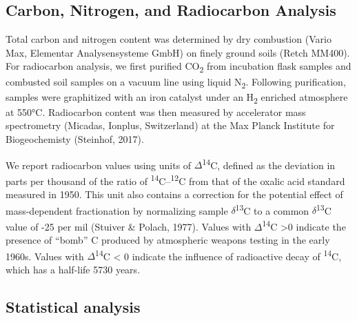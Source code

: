 \documentclass[english,man,floatsintext]{apa6}
\begin{document}
\hypertarget{carbon-nitrogen-and-radiocarbon-analysis}{%
\subsection{Carbon, Nitrogen, and Radiocarbon Analysis}\label{carbon-nitrogen-and-radiocarbon-analysis}}

Total carbon and nitrogen content was determined by dry combustion (Vario Max, Elementar Analysensysteme GmbH) on finely ground soils (Retch MM400). For radiocarbon analysis, we first purified CO\textsubscript{2} from incubation flask samples and combusted soil samples on a vacuum line using liquid N\textsubscript{2}. Following purification, samples were graphitized with an iron catalyst under an H\textsubscript{2} enriched atmosphere at 550°C. Radiocarbon content was then measured by accelerator mass spectrometry (Micadas, Ionplus, Switzerland) at the Max Planck Institute for Biogeochemisty (Steinhof, 2017).

We report radiocarbon values using units of \(\Delta\)\textsuperscript{14}C, defined as the deviation in parts per thousand of the ratio of \textsuperscript{14}C--\textsuperscript{12}C from that of the oxalic acid standard measured in 1950. This unit also contains a correction for the potential effect of mass-dependent fractionation by normalizing sample \(\delta\)\textsuperscript{13}C to a common \(\delta\)\textsuperscript{13}C value of -25 per mil (Stuiver \& Polach, 1977). Values with \(\Delta\)\textsuperscript{14}C \textgreater{}0 indicate the presence of \enquote{bomb} C produced by atmospheric weapons testing in the early 1960s. Values with \(\Delta\)\textsuperscript{14}C \textless{} 0 indicate the influence of radioactive decay of \textsuperscript{14}C, which has a half-life 5730 years.

\hypertarget{statistical-analysis}{%
\subsection{Statistical analysis}\label{statistical-analysis}}
\end{document}
